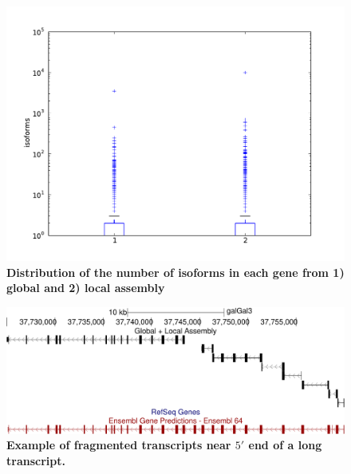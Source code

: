 \documentclass[10pt]{article}
\begin{document}
\begin{figure}[!ht]
\begin{center}
\includegraphics[width=5in]{isoforms_boxplot.pdf}
\end{center}
\caption{
{\bf Distribution of the number of isoforms in each gene from 1) global and 2) local assembly}
}
\label{isoforms_boxplot}
\end{figure}

\begin{figure}[!ht]
\begin{center}
\includegraphics[width=5in]{fragmented_transcripts.pdf}
\end{center}
\caption{
{\bf Example of fragmented transcripts near $5'$ end of a long transcript.}
}
\label{fragmented_transcripts}
\end{figure}
\end{document}
